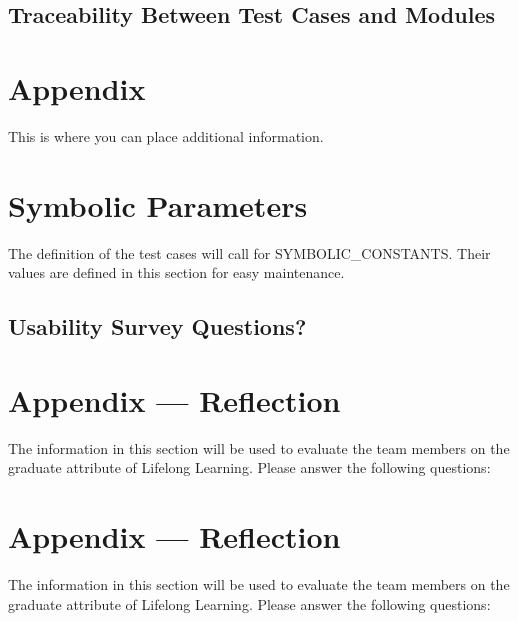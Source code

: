 \documentclass[12pt, titlepage]{article}
\begin{document}
\subsection{Traceability Between Test Cases and Modules}

				




\newpage

\section{Appendix}

This is where you can place additional information.

\section{Symbolic Parameters}

The definition of the test cases will call for SYMBOLIC\_CONSTANTS.
Their values are defined in this section for easy maintenance.

\subsection{Usability Survey Questions?}


\newpage{}
\section*{Appendix --- Reflection}

The information in this section will be used to evaluate the team members on the
graduate attribute of Lifelong Learning.  Please answer the following questions:

\newpage{}
\section*{Appendix --- Reflection}


The information in this section will be used to evaluate the team members on the
graduate attribute of Lifelong Learning.  Please answer the following questions:
\end{document}
